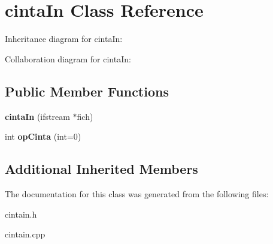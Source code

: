 \hypertarget{classcintaIn}{}\section{cinta\+In Class Reference}
\label{classcintaIn}


Inheritance diagram for cinta\+In\+:


Collaboration diagram for cinta\+In\+:
\subsection*{Public Member Functions}
\begin{DoxyCompactItemize}
\item 
\hypertarget{classcintaIn_a56f3c44da572e41d0d1cd719dcde65e7}{}{\bfseries cinta\+In} (ifstream $\ast$fich)\label{classcintaIn_a56f3c44da572e41d0d1cd719dcde65e7}

\item 
\hypertarget{classcintaIn_a06f93e0ed5b62f4be111220a783ffdde}{}int {\bfseries op\+Cinta} (int=0)\label{classcintaIn_a06f93e0ed5b62f4be111220a783ffdde}

\end{DoxyCompactItemize}
\subsection*{Additional Inherited Members}


The documentation for this class was generated from the following files\+:\begin{DoxyCompactItemize}
\item 
cintain.\+h\item 
cintain.\+cpp\end{DoxyCompactItemize}

